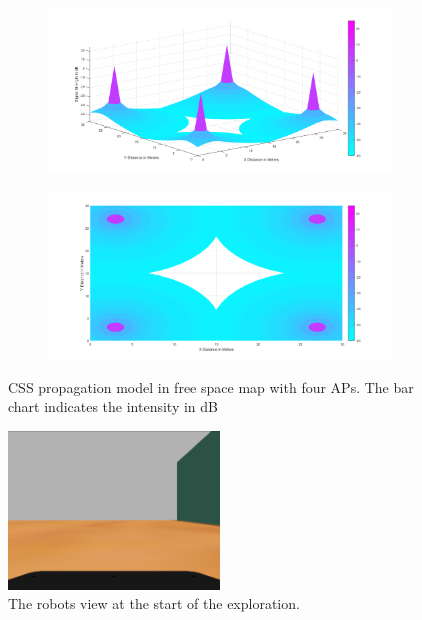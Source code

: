 \begin{figure}[!h]
\centering
	\begin{subfigure}[b]{0.75\textwidth}
		\includegraphics[width=\textwidth]{images/FAL_30x30_3d.png}
		\label{subfig:a}
		\caption{}
	\end{subfigure}
	\begin{subfigure}[b]{0.75\textwidth}
		\includegraphics[width=\textwidth]{images/FAL_30x30_tv.png}
		\label{subfig:b}
		\caption{}
	\end{subfigure}
\caption{CSS propagation model in free space map with four APs. The bar chart indicates the intensity in dB}
\end{figure}

\begin{figure}
    \centering
    \includegraphics[width=0.5\textwidth]{images/robotview.png}
    \caption{The robots view at the start of the exploration.}
    \label{fig:freespace}
\end{figure}

